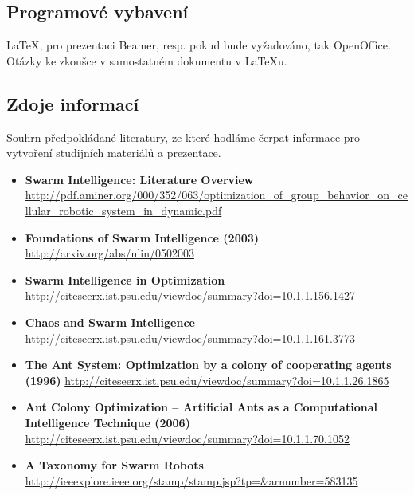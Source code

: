 \documentclass[a4paper,12pt]{article}
\begin{document}
\subsection*{Programové vybavení}
\LaTeX{}, pro prezentaci Beamer, resp. pokud bude vyžadováno, tak OpenOffice. Otázky ke zkoušce v samostatném dokumentu v \LaTeX{}u.


\subsection*{Zdoje informací}
Souhrn předpokládané literatury, ze které hodláme čerpat informace pro vytvoření studijních materiálů a prezentace.
\begin{itemize}
  \item {\bf Swarm Intelligence: Literature Overview} 
        \url{http://pdf.aminer.org/000/352/063/optimization\_of\_group\_behavior\_on\_cellular\_robotic\_system\_in\_dynamic.pdf}
  \item {\bf Foundations of Swarm Intelligence (2003)}
        \url{http://arxiv.org/abs/nlin/0502003} 
  \item {\bf Swarm Intelligence in Optimization}
        \url{http://citeseerx.ist.psu.edu/viewdoc/summary?doi=10.1.1.156.1427}
  \item {\bf Chaos and Swarm Intelligence}
        \url{http://citeseerx.ist.psu.edu/viewdoc/summary?doi=10.1.1.161.3773}
  \item {\bf The Ant System: Optimization by a colony of cooperating agents (1996)}
        \url{http://citeseerx.ist.psu.edu/viewdoc/summary?doi=10.1.1.26.1865}
  \item {\bf Ant Colony Optimization – Artificial Ants as a Computational Intelligence Technique (2006)}
        \url{http://citeseerx.ist.psu.edu/viewdoc/summary?doi=10.1.1.70.1052}
  \item {\bf A Taxonomy for Swarm Robots}
        \url{http://ieeexplore.ieee.org/stamp/stamp.jsp?tp=&arnumber=583135}
\end{itemize}
\end{document}
